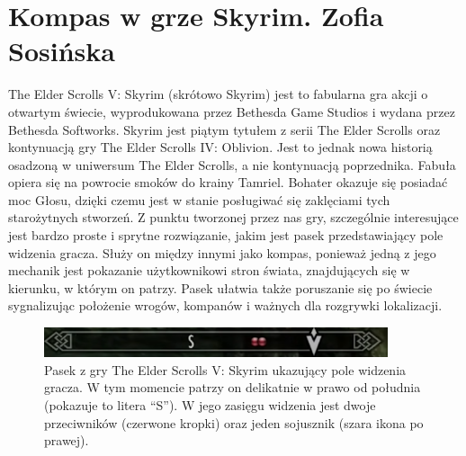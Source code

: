 \section{Kompas w grze Skyrim. Zofia Sosińska}\label{chap:skrm}

The Elder Scrolls V: Skyrim (skrótowo Skyrim) jest to fabularna gra akcji o otwartym świecie, wyprodukowana przez Bethesda Game Studios i wydana przez Bethesda Softworks. Skyrim jest piątym tytułem z serii The Elder Scrolls oraz kontynuacją gry The Elder Scrolls IV: Oblivion. Jest to jednak nowa historią osadzoną w uniwersum The Elder Scrolls, a nie kontynuacją poprzednika. Fabuła opiera się na powrocie smoków do krainy Tamriel. Bohater okazuje się posiadać moc Głosu, dzięki czemu jest w stanie posługiwać się zaklęciami tych starożytnych stworzeń.
	Z punktu tworzonej przez nas gry, szczególnie interesujące jest  bardzo proste i sprytne rozwiązanie, jakim jest pasek przedstawiający pole widzenia gracza. Służy on między innymi jako kompas, ponieważ jedną z jego mechanik jest pokazanie użytkownikowi stron świata, znajdujących się w kierunku, w którym on patrzy. Pasek ułatwia także poruszanie się po świecie sygnalizując położenie wrogów, kompanów i ważnych dla rozgrywki lokalizacji.

    \begin{figure}[htbp]
        \centering
        \includegraphics[width=0.9\textwidth]{images/ui/compassSkyrim.png}
        \caption{Pasek z gry The Elder Scrolls V: Skyrim ukazujący pole widzenia gracza. W tym momencie patrzy on delikatnie w prawo od południa (pokazuje to litera “S”). W jego zasięgu widzenia jest dwoje przeciwników (czerwone kropki) oraz jeden sojusznik (szara ikona po prawej).}\label{fig:Fallout}
    \end{figure}


